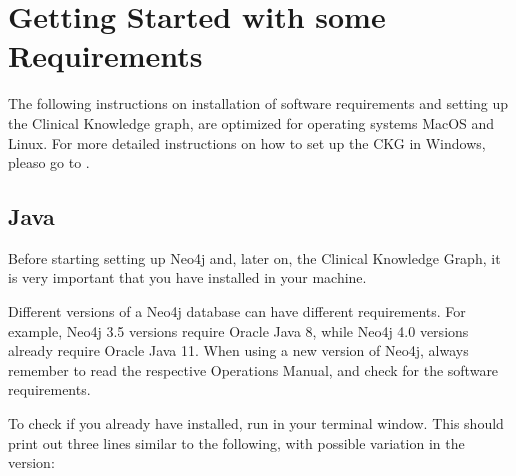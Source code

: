 \documentclass[letterpaper,10pt,english]{sphinxmanual}
\begin{document}
\section{Getting Started with some Requirements}
\label{\detokenize{intro/getting-started-with-requirements:getting-started-with-some-requirements}}\label{\detokenize{intro/getting-started-with-requirements::doc}}
The following instructions on installation of software requirements and setting up the Clinical Knowledge graph, are optimized for operating systems MacOS and Linux. For more detailed instructions on how to set up the CKG in Windows, pleaso go to {\hyperref[\detokenize{intro/getting-started-with-windows:windows-installation}]{}}.


\subsection{Java}
\label{\detokenize{intro/getting-started-with-requirements:java}}
Before starting setting up Neo4j and, later on, the Clinical Knowledge Graph, it is very important that you have  installed in your machine.

Different versions of a Neo4j database can have different requirements. For example, Neo4j 3.5 versions require Oracle Java 8, while Neo4j 4.0 versions already require Oracle Java 11.
When using a new version of Neo4j, always remember to read the respective Operations Manual, and check for the software requirements.

To check if you already have  installed, run  in your terminal window. This should print out three lines similar to the following, with possible variation in the version:

\begin{sphinxVerbatim}[commandchars=\\\{\}]
  
     
        
\end{sphinxVerbatim}
\end{document}
